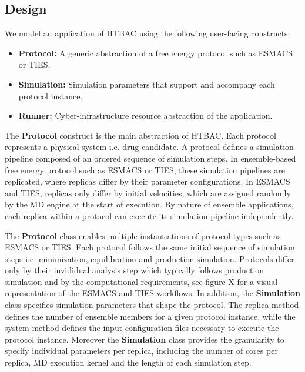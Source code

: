 \subsection{Design}

We model an application of HTBAC using the following user-facing constructs:

\begin{itemize}
  \item \textbf{Protocol:} A generic abstraction of a free energy protocol such
  as ESMACS or TIES. 
  \item \textbf{Simulation:} Simulation parameters that support and accompany 
  each protocol instance. 
  \item \textbf{Runner:} Cyber-infrastructure resource abstraction of the 
  application. 
\end{itemize}

The \textbf{Protocol} construct is the main abstraction of HTBAC. Each protocol
represents a physical system i.e. drug candidate. A protocol defines a
simulation pipeline composed of an ordered sequence of simulation steps. In
ensemble-based free energy protocol such as ESMACS or TIES, these simulation 
pipelines are replicated, where replicas differ by their parameter 
configurations. In ESMACS and TIES, replicas only differ by initial velocities, 
which are assigned randomly by the MD engine at the start of execution. By 
nature of ensemble applications, each replica within a protocol can execute its 
simulation pipeline independently. 

The \textbf{Protocol} class enables multiple instantiations of protocol types
such as ESMACS or TIES. Each protocol follows the same initial sequence of 
simulation steps i.e. minimization, equilibration and production simulation.  
Protocols differ only by their invididual analysis step which typically follows 
production simulation and by the computational requirements,  
see figure X for a visual representation of the ESMACS and TIES workflows. 
In addition, the \textbf{Simulation} class specifies simulation parameters that
shape the protocol. The replica method defines the number of ensemble members 
for a given protocol instance, while the system method defines the input
configuration files necessary to execute the protocol instance. Moreover the 
\textbf{Simulation} class provides the granularity to specify individual 
parameters per replica, including the number of cores per replica, MD execution 
kernel and the length of each simulation step.

